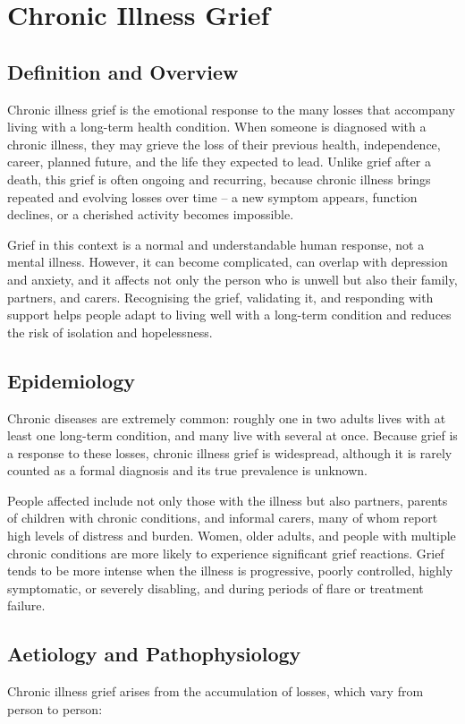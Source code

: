 \chapter{Chronic Illness Grief}

\section*{Definition and Overview}
Chronic illness grief is the emotional response to the many losses that accompany living with a long-term health condition. When someone is diagnosed with a chronic illness, they may grieve the loss of their previous health, independence, career, planned future, and the life they expected to lead. Unlike grief after a death, this grief is often ongoing and recurring, because chronic illness brings repeated and evolving losses over time -- a new symptom appears, function declines, or a cherished activity becomes impossible.

Grief in this context is a normal and understandable human response, not a mental illness. However, it can become complicated, can overlap with depression and anxiety, and it affects not only the person who is unwell but also their family, partners, and carers. Recognising the grief, validating it, and responding with support helps people adapt to living well with a long-term condition and reduces the risk of isolation and hopelessness.

\section*{Epidemiology}
Chronic diseases are extremely common: roughly one in two adults lives with at least one long-term condition, and many live with several at once. Because grief is a response to these losses, chronic illness grief is widespread, although it is rarely counted as a formal diagnosis and its true prevalence is unknown.

People affected include not only those with the illness but also partners, parents of children with chronic conditions, and informal carers, many of whom report high levels of distress and burden. Women, older adults, and people with multiple chronic conditions are more likely to experience significant grief reactions. Grief tends to be more intense when the illness is progressive, poorly controlled, highly symptomatic, or severely disabling, and during periods of flare or treatment failure.

\section*{Aetiology and Pathophysiology}
Chronic illness grief arises from the accumulation of losses, which vary from person to person:

